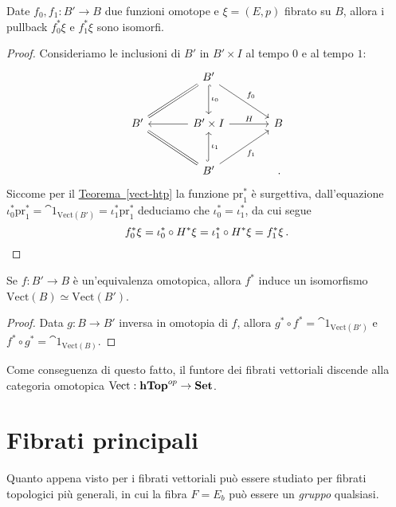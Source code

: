 \begin{cor}
	Date $f_{0},f_{1}:B' \to B$ due funzioni omotope e $\xi = (E,p)$ fibrato su $B$,
	allora i pullback $f_{0}^{*}\xi$ e $f_{1}^{*}\xi$ sono isomorfi.
	\begin{proof}
		Consideriamo le inclusioni di $B'$ in $B' \times I$ al tempo $0$ e al tempo $1$:
		\begin{equation*}
			\begin{tikzcd}[column sep=large, row sep=large]
				& B' \ar[dl, equals] \ar[dr, "f_{0}"] \ar[d, "\iota_{0}", hook] & \\
				B' 
				& B' \times I \ar[l] \ar[r, "H"]
				& B \\
				& B' \ar[ul, equals] \ar[ur, "f_{1}"'] \ar[u, "\iota_{1}"', hook] & \,.
			\end{tikzcd}
		\end{equation*}
		Siccome per il \hyperref[vect-htp]{Teorema~\ref{vect-htp}}
		la funzione $\mathrm{pr}_{1}^{*}$ è surgettiva,
		dall'equazione $\iota_{0}^{*}\mathrm{pr}_{1}^{*} = \cat{1}_{\mathrm{Vect}(B')} 
		=\iota_{1}^{*}\mathrm{pr}_{1}^{*}$ deduciamo che $\iota_{0}^{*}=\iota_{1}^{*}$,
		da cui segue
		\begin{equation*}
			f_{0}^{*}\xi = \iota_{0}^{*} \circ H^{*} \xi = \iota_{1}^{*} \circ H^{*} \xi = f_{1}^{*}\xi\,. \qedhere
		\end{equation*}
	\end{proof}
\end{cor}


\begin{cor}
	Se $f:B' \to B$ è un'equivalenza omotopica, allora $f^{*}$ 
	induce un isomorfismo $\mathrm{Vect}(B) \simeq \mathrm{Vect}(B')$.
	\begin{proof}
		Data $g:B \to B'$ inversa in omotopia di $f$, allora
		$g^{*} \circ f^{*} = \cat{1}_{\mathrm{Vect}(B')}$ e $f^* \circ g^{*} = \cat{1}_{\mathrm{Vect}(B)}$.
	\end{proof}
\end{cor}

Come conseguenza di questo fatto, il funtore dei fibrati vettoriali
discende alla categoria omotopica $\mathrm{Vect}:{\normalfont\textbf{hTop}}^{op} \to {\normalfont\textbf{Set}}$.

\section{Fibrati principali}

Quanto appena visto per i fibrati vettoriali può essere studiato
per fibrati topologici più generali, in cui la fibra $F = E_{b}$ può essere un \emph{gruppo}
qualsiasi.


